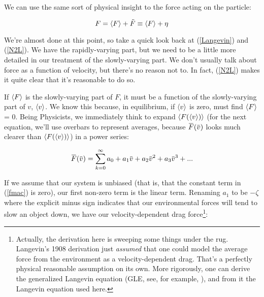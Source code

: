 \documentclass[12pt]{article}
\begin{document}
We can use the same sort of physical insight to the force acting on
the particle:

\begin{equation}
  \label{fphysicalinsight}
  F = \left< F\right> + \tilde{F} \equiv \left< F\right> + \eta
\end{equation}

We're almost done at this point, so take a quick look back at
(\ref{Langevin}) and (\ref{N2L}). We have the rapidly-varying part,
but we need to be a little more detailed in our treatment of the
slowly-varying part. We don't usually talk about force as
a function of velocity, but there's no reason not to. In fact,
(\ref{N2L}) makes it quite clear that it's
reasonable to do so.

If $\left< F\right>$ is the slowly-varying part of $F$, it must be a function
of the slowly-varying part of $v$, $\left< v\right>$. We know this because,
in equilibrium, if $\left< v\right>$ is zero, must find $\left< F\right>$ = 0. Being
Physicists, we immediately think to expand $\left< F(\left< v\right>)\right>$ (for
the next equation, we'll use overbars to represent averages, because
$\avg{F}(\avg{v})$ looks much clearer than $\left< F(\left< v\right>)\right>$) in a power series:

\begin{equation}
  \label{fmac}
  \avg{F}(\avg{v}) = \sum_{k=0}^\infty a_0 + a_1\avg{v} + a_2\avg{v}^2 + a_3\avg{v}^3 + ...
\end{equation}

If we assume that our system is unbiased (that is, that the constant
term in (\ref{fmac}) is zero), our first non-zero term is the linear
term. Renaming $a_1$ to be $-\zeta$ where the explicit minus sign
indicates that our environmental forces will tend to slow an object
down, we have our velocity-dependent drag force\footnote{Actually, the
derivation here is sweeping some things under the rug. Langevin's 1908
derivation just \textit{assumed} that one could model the average
force from the environment as a velocity-dependent drag. That's a
perfectly physical reasonable assumption on its own. More rigorously,
one can derive the generalized Langevin equation (GLE, see, for
example, \cite{TuckermanStatMechSim}), and from it
the Langevin equation used here.}:
\end{document}

